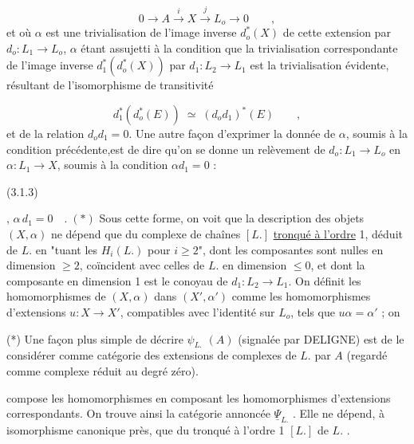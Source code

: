 \begin{equation}\tag{3.1.2}
0 \longrightarrow A \overset{i}{\longrightarrow} X \overset{j}{\longrightarrow} L_o \longrightarrow 0 \qquad ,
\end{equation}
et où $\alpha$ est une trivialisation de l'image inverse $d^*_o(X)$ de cette extension par $d_o:L_1 \longrightarrow L_o$, $\alpha$ étant assujetti à la condition que la trivialisation correspondante de l'image inverse $d^*_1(d^*_o(X))$ par $d_1 : L_2 \longrightarrow L_1$ est la trivialisation évidente, résultant de l'isomorphisme de transitivité

\begin{equation*}
d^*_1(d^*_o(E)) \;\simeq\; (d_o d_1)^*(E) \qquad ,
\end{equation*}
et de la relation $d_od_1=0$. Une autre façon d'exprimer la donnée de $\alpha$, soumis à la condition précédente,est de dire qu'on se donne un relèvement de $d_o : L_1 \longrightarrow L_o$ en $\alpha : L_1 \longrightarrow X$, soumis à la condition $\alpha d_1 = 0$ :

(3.1.3) \qquad , \quad $\alpha\, d_1 = 0 \quad . \;(*)$
Sous cette forme, on voit que la description des objets $(X,\alpha)$ ne dépend que du complexe de chaînes $[L.]$ \underline{tronqué à l'ordre} 1, déduit de $L.$ en "tuant les $H_i(L.)$ pour $i \geq 2$", dont les composantes sont nulles en dimension $\geq 2$, coïncident avec celles de $L.$ en dimension $\leq 0$, et dont la composante en dimension 1 est le conoyau de $d_1: L_2 \longrightarrow L_1$. On définit les homomorphismes de $(X,\alpha)$ dans $(X',\alpha')$ comme les homomorphismes d'extensions $u: X \longrightarrow X'$, compatibles avec l'identité sur $L_o$, tels que $u \alpha = \alpha'$ ; on 

(*)  Une façon plus simple de décrire  $\psi_{L.}$ $(A)$  (signalée par DELIGNE) est de le considérer comme catégorie des extensions de complexes de  $L.$  par  $A$ (regardé comme complexe réduit au degré zéro).



 compose les homomorphismes en composant les homomorphismes d'extensions correspondants. On trouve ainsi la catégorie annoncée $\underline{\Psi}_{L.}$ . Elle ne dépend, à isomorphisme canonique près, que du tronqué à l'ordre 1 $[L.]$ de $L.$ .

